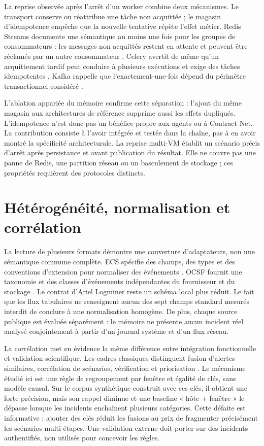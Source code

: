 La reprise observée après l'arrêt d'un worker combine deux mécanismes. Le transport
conserve ou réattribue une tâche non acquittée ; le magasin d'idempotence empêche que la
nouvelle tentative répète l'effet métier. Redis Streams documente une sémantique au moins
une fois pour les groupes de consommateurs : les messages non acquittés restent en
attente et peuvent être réclamés par un autre consommateur
\cite{redis2026streams}. Celery avertit de même qu'un acquittement tardif peut conduire à
plusieurs exécutions et exige des tâches idempotentes \cite{celery2026tasks}. Kafka
rappelle que l'exactement-une-fois dépend du périmètre transactionnel considéré
\cite{kafka2026semantics}.

L'ablation appariée du mémoire confirme cette séparation : l'ajout du même magasin aux
architectures de référence supprime aussi les effets dupliqués. L'idempotence n'est donc
pas un bénéfice propre aux agents ou à Contract Net. La contribution consiste à l'avoir
intégrée et testée dans la chaîne, pas à en avoir montré la spécificité architecturale.
La reprise multi-VM établit un scénario précis d'arrêt après persistance et avant
publication du résultat. Elle ne couvre pas une panne de Redis, une partition réseau ou
un basculement de stockage ; ces propriétés requièrent des protocoles distincts.

\section{Hétérogénéité, normalisation et corrélation}

La lecture de plusieurs formats démontre une couverture d'adaptateurs, non une sémantique
commune complète. ECS spécifie des champs, des types et des conventions d'extension pour
normaliser des événements \cite{elastic2026ecs}. OCSF fournit une taxonomie et des classes
d'événements indépendantes du fournisseur et du stockage \cite{ocsf2026schema}. Le
contrat d'Ariel Logminer reste un schéma local plus réduit. Le fait que les flux
tabulaires ne renseignent aucun des sept champs standard mesurés interdit de conclure à
une normalisation homogène. De plus, chaque source publique est évaluée séparément : le
mémoire ne présente aucun incident réel analysé conjointement à partir d'un journal
système et d'un flux réseau.

La corrélation met en évidence la même différence entre intégration fonctionnelle et
validation scientifique. Les cadres classiques distinguent fusion d'alertes similaires,
corrélation de scénarios, vérification et priorisation
\cite{cuppens2002alert,valeur2004correlation}. Le mécanisme étudié ici est une règle de
regroupement par fenêtre et égalité de clés, sans modèle causal. Sur le corpus synthétique
construit avec ces clés, il obtient une forte précision, mais son rappel diminue et une
baseline « hôte + fenêtre » le dépasse lorsque les incidents enchaînent plusieurs
catégories. Cette défaite est informative : ajouter des clés réduit les fusions au prix
de fragmenter précisément les scénarios multi-étapes. Une validation externe doit porter
sur des incidents authentifiés, non utilisés pour concevoir les règles.

